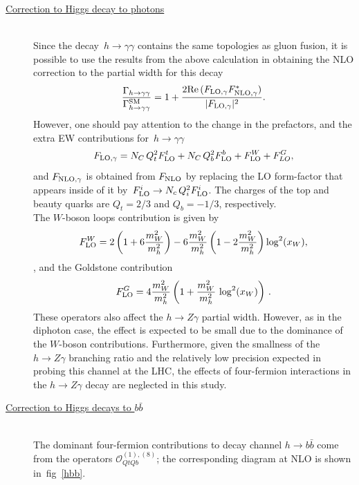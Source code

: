 \begin{description}
		\item [\underline{Correction to Higgs decay to photons }] \hfill  \vspace{0.3cm} \\
	Since the decay~$ h \to \gamma \gamma$ contains the same topologies as gluon fusion, it is possible to use the results from the above calculation in obtaining the NLO correction to the partial width for this decay
		\begin{equation}
			\frac{\Gamma_{h\to \gamma\gamma}}{\Gamma_{h\to \gamma\gamma}^{\mathrm{SM}}}= 1+ \frac{2 \mbox{Re}\,(F_{\textrm{LO}, \gamma} F^*_{\textrm{NLO},\gamma})}{  |F_{\textrm{LO}, \gamma}|^2} .
		\end{equation}
		However, one should pay attention to the change in the prefactors, and the extra EW contributions for~$ h \to \gamma \gamma$ 
		\begin{equation}
			F_{\textrm{LO}, \gamma}= N_C\,Q_t^2 F_{\textrm{LO}}^t+ N_C\,Q_b^2 F_{\textrm{LO}}^b+F_{\textrm{LO}}^W+ F^G_{LO} ,
		\end{equation}
		and $F_{\textrm{NLO}, \gamma}$ is obtained from $F_{\textrm{NLO}}$ by replacing the LO form-factor that appears inside of it by~$ F_{\textrm{LO}}^i \to N_c \,Q_i^2 F_{\textrm{LO}}^i$. The charges of the top and beauty quarks are $Q_t=2/3$ and $Q_b=-1/3$, respectively.\\ The $W$-boson loops contribution is given by
		\begin{equation}
			F_{\textrm{LO}}^W= 2 \left(1+6 \frac{m_W^2}{m_h^2}\right)-6 \frac{m_W^2}{  m_h^2} \left(1-2  \frac{m_W^2}{m_h^2}\right) \log^2(x_W),
		\end{equation}
		, and the Goldstone contribution
		\begin{equation}
			F_{\textrm{LO}}^G=4\frac{m_W^2}{m_h^2} \left( 1+ \frac{m_W^2}{m_h^2} \,\log^2(x_W) \right)\,.
		\end{equation}
		These operators also affect the $h\to Z\gamma$ partial width. However, as in the diphoton case, the effect is expected to be small due to the dominance of the $W$-boson contributions.  Furthermore, given the smallness of the $h\to Z\gamma$ branching ratio and the relatively low precision expected in probing this channel at the LHC, the effects of four-fermion interactions in the $ h \to Z\gamma$ decay are neglected in this study.
		\item [\underline{Correction to Higgs decays to $b \bar{b}$ }] \hfill  \vspace{0.3cm} \\
		The dominant four-fermion contributions to decay channel $h \to b\bar b$ come from the operators  $\mathcal{O}_{QtQb}^{(1),(8)}$; the corresponding diagram at NLO is shown in~fig~\ref{hbb}. 

\end{description}
